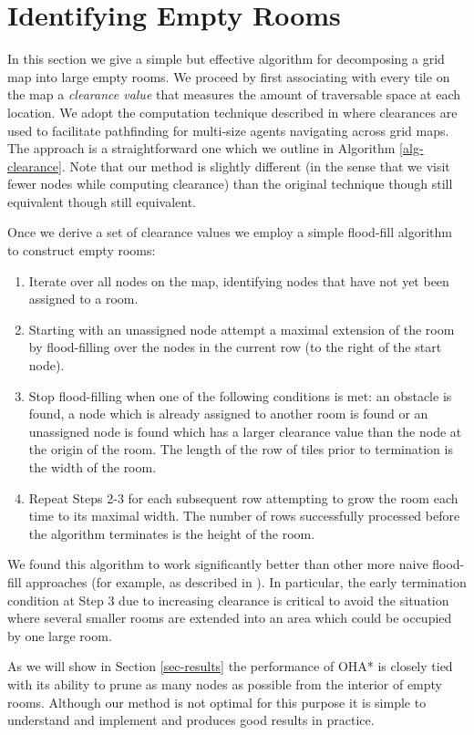 \section{Identifying Empty Rooms}
\label{empty rooms}
In this section we give a simple but effective algorithm for decomposing a grid map
into large empty rooms.
We proceed by first associating with every tile on the map a \emph{clearance value} 
that measures the amount of traversable space at each location.
We adopt the computation technique described in \cite{harabor08} where clearances
are used to facilitate pathfinding for multi-size agents navigating across grid maps.
The approach is a straightforward one which we outline in Algorithm \ref{alg-clearance}.
Note that our method is slightly different (in the sense that we visit fewer nodes
while computing clearance) than the original technique though still equivalent though still equivalent.



Once we derive a set of clearance values we employ a simple flood-fill algorithm to 
construct empty rooms:

\begin{enumerate}
\item{Iterate over all nodes on the map, identifying nodes that have not yet 
been assigned to a room.}
\item{Starting with an unassigned node attempt a maximal extension of the room
by flood-filling over the nodes in the current row (to the right of the start node).}
\item{Stop flood-filling when one of the following conditions is met: an obstacle is found,
a node which is already assigned to another room is found or an unassigned
node is found which has a larger clearance value than the node at the origin of the room.
The length of the row of tiles prior to termination is the width of the room.}
\item{Repeat Steps 2-3 for each subsequent row attempting to grow the room
each time to its maximal width.
The number of rows successfully processed before the algorithm terminates is the height of the room.}
\end{enumerate}

We found this algorithm to work significantly better than other more naive flood-fill
approaches (for example, as described in \cite{bjornsson06,bolanca09}). 
In particular, the early termination condition at Step 3 
due to increasing clearance is critical to avoid the situation where
several smaller rooms are extended into an area which could be occupied by one large room.

As we will show in Section \ref{sec-results} the performance of OHA* is closely
tied with its ability to prune as many nodes as possible from the interior of 
empty rooms. 
Although our method is not optimal for this purpose it is simple
to understand and implement and produces good results in practice.
